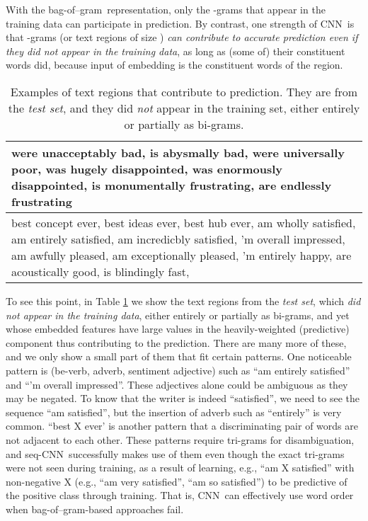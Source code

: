 \documentclass[11pt,letterpaper]{article}
\newcommand{\cnn}{CNN}
\newcommand{\scnn}{seq-CNN}
\newcommand{\bongram}{bag-of--gram}
\begin{document}
With the \bongram\ representation, 
only the -grams that 
appear in the training data can participate in prediction. 
By contrast, 
one strength of \cnn\ is that -grams (or text regions of size ) 
{\em can contribute to accurate prediction even if they did not appear in the training data}, 
as long as (some of) their constituent words did, 
because input of embedding is the constituent words of the region.   
\begin{table}
\begin{center}
\begin{footnotesize}
\begin{tabular}{|p{2.9in}|} 
\hline
{\small 
were unacceptably bad, is abysmally bad,  were universally poor, was hugely disappointed, was enormously disappointed, 
is monumentally frustrating,  are endlessly frustrating
}\\
\hline
{\small 
best concept ever, best ideas ever, best hub ever, am wholly satisfied, 
am entirely satisfied, am incredicbly satisfied, 
'm overall impressed, am awfully pleased, 
am exceptionally pleased, 'm entirely happy, 
are acoustically good, is blindingly fast, 
}\\
\hline
\end{tabular}
\end{footnotesize}
\vspace{-0.1in}
\caption{ \label{tab:bv-tstonly} \small
Examples of text regions that contribute to prediction. 
They are from the {\em test set}, and they 
did {\em not} appear in the training set, either entirely or partially as bi-grams.  
}
\end{center}
\end{table}
To see this point, in Table \ref{tab:bv-tstonly} we show the text regions from the {\em test set}, 
which {\em did not appear in the training data}, either entirely or partially as bi-grams, 
and yet whose embedded features have large values in the heavily-weighted (predictive) component 
thus contributing to the prediction.  
There are many more of these, and we only show a small part of them that fit certain patterns.  
One noticeable pattern is (be-verb, adverb, sentiment adjective) such as 
``am entirely satisfied'' and ``'m overall impressed''.  
These adjectives alone could be ambiguous as they may be negated.  To know that the 
writer is indeed ``satisfied'', we need to see the sequence ``am satisfied'', 
but the insertion of adverb such as ``entirely''  
is very common.  ``best X ever' is another pattern that a discriminating pair of words are not adjacent to 
each other.  These patterns require tri-grams for disambiguation, and 
\scnn\ successfully makes use of them even though the exact tri-grams were not seen during training, 
as a result of learning, e.g., ``am X satisfied'' with non-negative X 
(e.g., ``am very satisfied'', ``am so satisfied'') 
to be predictive of the positive class through training. 
That is, 
\cnn\ can effectively use word order when \bongram-based approaches fail.  
\end{document}
